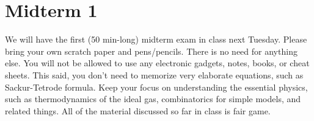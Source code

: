 \section*{Midterm 1}
We will have the first (50 min-long) midterm exam in class next Tuesday. Please bring your own scratch paper and pens/pencils. There is no need for anything else. You will not be allowed to use any electronic gadgets, notes, books, or cheat sheets. This said, you don't need to memorize very elaborate equations, such as Sackur-Tetrode formula. Keep your focus on understanding the essential physics, such as thermodynamics of the ideal gas, combinatorics for simple models, and related things. All of the material discussed so far in class is fair game.